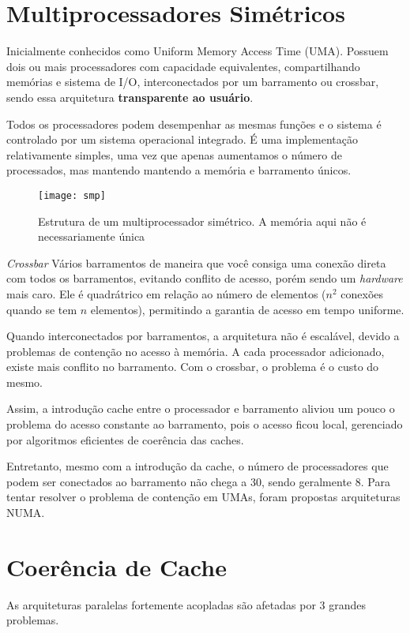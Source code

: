 \section{Multiprocessadores Simétricos}

Inicialmente conhecidos como Uniform Memory Access Time (UMA). Possuem dois ou mais processadores com capacidade equivalentes, compartilhando memórias e sistema de I/O, interconectados por um barramento ou crossbar, sendo essa arquitetura \textbf{transparente ao usuário}.

Todos os processadores podem desempenhar as mesmas funções e o sistema é controlado por um sistema operacional integrado. É uma implementação relativamente simples, uma vez que apenas aumentamos o número de processados, mas mantendo mantendo a memória e barramento únicos.

\begin{figure}[ht]
  \centering
  \texttt{[image: smp]}
  \label{fig:smp}
  \caption{Estrutura de um multiprocessador simétrico. A memória aqui não é necessariamente única}
\end{figure}

\begin{definicao}{\textit{Crossbar}}
  Vários barramentos de maneira que você consiga uma conexão direta com todos os barramentos, evitando conflito de acesso, porém sendo um \textit{hardware} mais caro. Ele é quadrátrico em relação ao número de elementos ($n^2$ conexões quando se tem $n$ elementos), permitindo a garantia de acesso em tempo uniforme.
\end{definicao}

Quando interconectados por barramentos, a arquitetura não é escalável, devido a problemas de contenção no acesso à memória. A cada processador adicionado, existe mais conflito no barramento. Com o crossbar, o problema é o custo do mesmo.

Assim, a introdução cache entre o processador e barramento aliviou um pouco o problema do acesso constante ao barramento, pois o acesso ficou local, gerenciado por algoritmos eficientes de coerência das caches.

Entretanto, mesmo com a introdução da cache, o número de processadores que podem ser conectados ao barramento não chega a 30, sendo geralmente 8. Para tentar resolver o problema de contenção em UMAs, foram propostas arquiteturas NUMA.




\section{Coerência de Cache}
As arquiteturas paralelas fortemente acopladas são afetadas por 3 grandes problemas.

